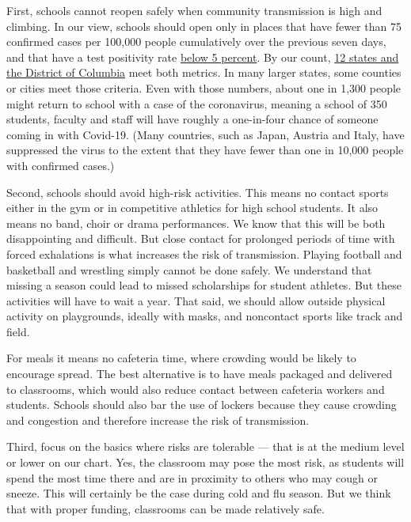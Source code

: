 First, schools cannot reopen safely when community transmission is high
and climbing. In our view, schools should open only in places that have
fewer than 75 confirmed cases per 100,000 people cumulatively over the
previous seven days, and that have a test positivity rate
\href{https://coronavirus.jhu.edu/testing/tracker/overview}{below 5
percent}. By our count,
\href{https://www.nytimes3xbfgragh.onion/interactive/2020/us/coronavirus-us-cases.html\#states}{12
states and the District of Columbia} meet both metrics. In many larger
states, some counties or cities meet those criteria. Even with those
numbers, about one in 1,300 people might return to school with a case of
the coronavirus, meaning a school of 350 students, faculty and staff
will have roughly a one-in-four chance of someone coming in with
Covid-19. (Many countries, such as Japan, Austria and Italy, have
suppressed the virus to the extent that they have fewer than one in
10,000 people with confirmed cases.)

Second, schools should avoid high-risk activities. This means no contact
sports either in the gym or in competitive athletics for high school
students. It also means no band, choir or drama performances. We know
that this will be both disappointing and difficult. But close contact
for prolonged periods of time with forced exhalations is what increases
the risk of transmission. Playing football and basketball and wrestling
simply cannot be done safely. We understand that missing a season could
lead to missed scholarships for student athletes. But these activities
will have to wait a year. That said, we should allow outside physical
activity on playgrounds, ideally with masks, and noncontact sports like
track and field.

For meals it means no cafeteria time, where crowding would be likely to
encourage spread. The best alternative is to have meals packaged and
delivered to classrooms, which would also reduce contact between
cafeteria workers and students. Schools should also bar the use of
lockers because they cause crowding and congestion and therefore
increase the risk of transmission.

Third, focus on the basics where risks are tolerable --- that is at the
medium level or lower on our chart. Yes, the classroom may pose the most
risk, as students will spend the most time there and are in proximity to
others who may cough or sneeze. This will certainly be the case during
cold and flu season. But we think that with proper funding, classrooms
can be made relatively safe.

